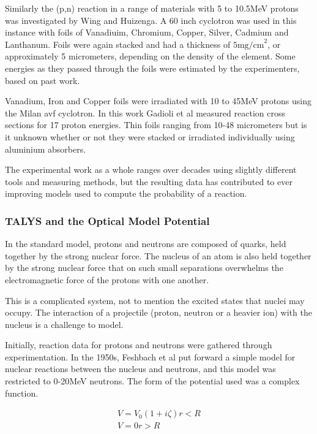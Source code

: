 Similarly the (p,n) reaction in a range of materials with 5 to 10.5MeV protons was investigated by Wing and Huizenga\cite{exforwing}.  A 60 inch cyclotron was used in this instance with foils of Vanadiuim, Chromium, Copper, Silver, Cadmium and Lanthanum.  Foils were again stacked and had a thickness of $5 \text{mg/cm}^{2}$, or approximately 5 micrometers, depending on the density of the element.  Some energies as they passed through the foils were estimated by the experimenters, based on past work.  

Vanadium, Iron and Copper foils were irradiated with 10 to 45MeV protons using the Milan \acrfull{avf} cyclotron.  In this work Gadioli et al\cite{exforgadioli} measured reaction cross sections for 17 proton energies.  Thin foils ranging from 10-48 micrometers but is it unknown whether or not they were stacked or irradiated individually using aluminium absorbers.

The experimental work as a whole ranges over decades using slightly different tools and measuring methods, but the resulting data has contributed to ever improving models used to compute the probability of a reaction.

\FloatBarrier

\subsubsection{TALYS and the Optical Model Potential}

In the standard model, protons and neutrons are composed of quarks, held together by the strong nuclear force.  The nucleus of an atom is also held together by the strong nuclear force that on such small separations overwhelms the electromagnetic force of the protons with one another.

This is a complicated system, not to mention the excited states that nuclei may occupy.  The interaction of a projectile (proton, neutron or a heavier ion) with the nucleus is a challenge to model.

Initially, reaction data for protons and neutrons were gathered through experimentation.  In the 1950s, Feshbach et al put forward a simple model for nuclear reactions between the nucleus and neutrons, and this model was restricted to 0-20MeV neutrons.  The form of the potential used was a complex function\cite{hodgson1}.

\begin{equation}
\begin{split}
V = V_0 (1 + i \zeta) r < R \\
V = 0 r > R
\end{split}
\label{eq:FeshbachPotential}
\end{equation}

